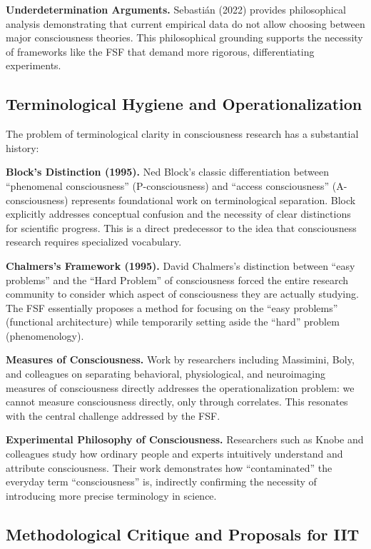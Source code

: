 \documentclass[12pt,a4paper]{article}
\begin{document}
\textbf{Underdetermination Arguments.} Sebasti\'{a}n (2022) provides philosophical analysis demonstrating that current empirical data do not allow choosing between major consciousness theories. This philosophical grounding supports the necessity of frameworks like the FSF that demand more rigorous, differentiating experiments.

\subsection{Terminological Hygiene and Operationalization}

The problem of terminological clarity in consciousness research has a substantial history:

\textbf{Block's Distinction (1995).} Ned Block's classic differentiation between ``phenomenal consciousness'' (P-consciousness) and ``access consciousness'' (A-consciousness) represents foundational work on terminological separation. Block explicitly addresses conceptual confusion and the necessity of clear distinctions for scientific progress. This is a direct predecessor to the idea that consciousness research requires specialized vocabulary.

\textbf{Chalmers's Framework (1995).} David Chalmers's distinction between ``easy problems'' and the ``Hard Problem'' of consciousness forced the entire research community to consider which aspect of consciousness they are actually studying. The FSF essentially proposes a method for focusing on the ``easy problems'' (functional architecture) while temporarily setting aside the ``hard'' problem (phenomenology).

\textbf{Measures of Consciousness.} Work by researchers including Massimini, Boly, and colleagues on separating behavioral, physiological, and neuroimaging measures of consciousness directly addresses the operationalization problem: we cannot measure consciousness directly, only through correlates. This resonates with the central challenge addressed by the FSF.

\textbf{Experimental Philosophy of Consciousness.} Researchers such as Knobe and colleagues study how ordinary people and experts intuitively understand and attribute consciousness. Their work demonstrates how ``contaminated'' the everyday term ``consciousness'' is, indirectly confirming the necessity of introducing more precise terminology in science.

\subsection{Methodological Critique and Proposals for IIT}
\end{document}
